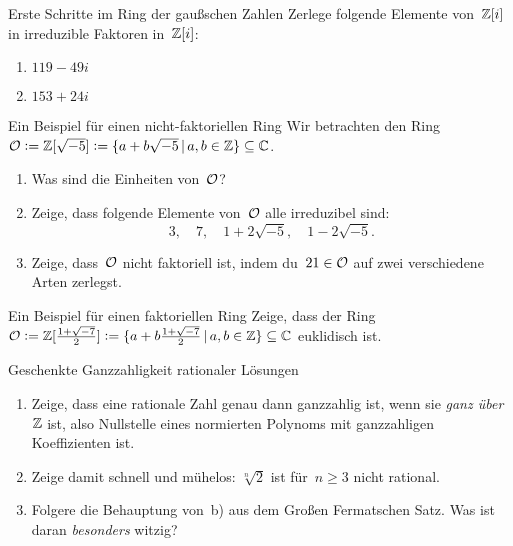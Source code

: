 \documentclass{uebblatt}
\begin{document}

\begin{aufgabe}{Erste Schritte im Ring der gaußschen Zahlen}
Zerlege folgende Elemente von~$\mathbb{Z}[i]$ in irreduzible Faktoren in~$\mathbb{Z}[i]$:
\begin{multicols}{2}
\begin{enumerate}
\item $119 - 49i$
\item $153 + 24i$
\end{enumerate}
\end{multicols}
\vspace{-1em}
\end{aufgabe}

\begin{aufgabe}{Ein Beispiel für einen nicht-faktoriellen Ring}
Wir betrachten den Ring~$ \mathcal{O} \vcentcolon= \mathbb{Z}[\sqrt{-5}] \vcentcolon= \{ a + b \sqrt{-5} \,|\, a,b \in \mathbb{Z} \}
\subseteq \mathbb{C}$.
\begin{enumerate}
\item Was sind die Einheiten von~$\mathcal{O}$?
\item Zeige, dass folgende Elemente von~$\mathcal{O}$ alle irreduzibel sind:
\[ 3, \quad 7, \quad 1 + 2\sqrt{-5}, \quad 1 - 2\sqrt{-5}. \]
\item Zeige, dass~$\mathcal{O}$ nicht faktoriell ist, indem du~$21 \in \mathcal{O}$ auf zwei
verschiedene Arten zerlegst.
\end{enumerate}
\end{aufgabe}

\begin{aufgabe}{Ein Beispiel für einen faktoriellen Ring}
Zeige, dass der Ring
$\mathcal{O} \vcentcolon= \mathbb{Z}[\tfrac{1+\sqrt{-7}}{2}] \vcentcolon=
  \{ a + b \tfrac{1+\sqrt{-7}}{2} \,|\, a,b \in \mathbb{Z} \} \subseteq \mathbb{C}$
euklidisch ist.
\end{aufgabe}

\begin{aufgabe}{Geschenkte Ganzzahligkeit rationaler Lösungen}
\begin{enumerate}
\item Zeige, dass eine rationale Zahl genau dann ganzzahlig ist, wenn sie
\emph{ganz über~$\mathbb{Z}$} ist, also Nullstelle eines normierten Polynoms mit
ganzzahligen Koeffizienten ist.
\item Zeige damit schnell und mühelos: $\sqrt[n]{2}$ ist für~$n \geq 3$ nicht
rational.
\item Folgere die Behauptung von~b) aus dem Großen Fermatschen Satz. Was ist daran
\emph{besonders} witzig?
\end{enumerate}
\end{aufgabe}
\end{document}
